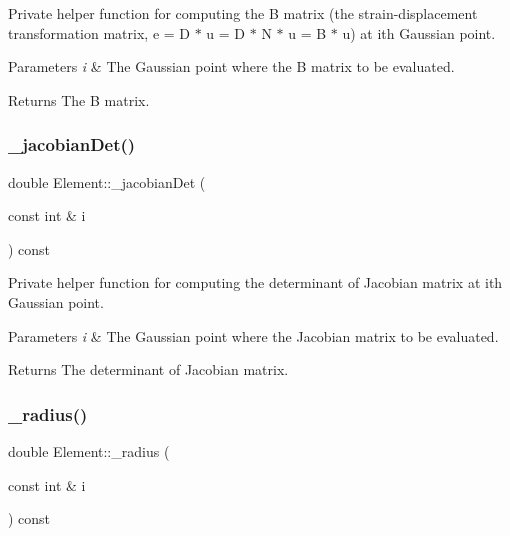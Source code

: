 Private helper function for computing the B matrix (the strain-\/displacement transformation matrix, e = D $\ast$ u = D $\ast$ N $\ast$ u = B $\ast$ u) at ith Gaussian point. 


\begin{DoxyParams}{Parameters}
{\em i} & The Gaussian point where the B matrix to be evaluated. \\
\hline
\end{DoxyParams}
\begin{DoxyReturn}{Returns}
The B matrix. 
\end{DoxyReturn}
\mbox{\label{class_element_a3ac0c5f98e318c8cbd331f1ea06cf43d}} 
\subsubsection{\texorpdfstring{\+\_\+jacobian\+Det()}{\_jacobianDet()}}
{\footnotesize\ttfamily double Element\+::\+\_\+jacobian\+Det (\begin{DoxyParamCaption}\item[{const int \&}]{i }\end{DoxyParamCaption}) const\hspace{0.3cm}{\ttfamily [protected]}}



Private helper function for computing the determinant of Jacobian matrix at ith Gaussian point. 


\begin{DoxyParams}{Parameters}
{\em i} & The Gaussian point where the Jacobian matrix to be evaluated. \\
\hline
\end{DoxyParams}
\begin{DoxyReturn}{Returns}
The determinant of Jacobian matrix. 
\end{DoxyReturn}
\mbox{\label{class_element_a9bc684fa8143312e39e3ff59e1cc2e32}} 
\subsubsection{\texorpdfstring{\+\_\+radius()}{\_radius()}}
{\footnotesize\ttfamily double Element\+::\+\_\+radius (\begin{DoxyParamCaption}\item[{const int \&}]{i }\end{DoxyParamCaption}) const\hspace{0.3cm}{\ttfamily [protected]}}




